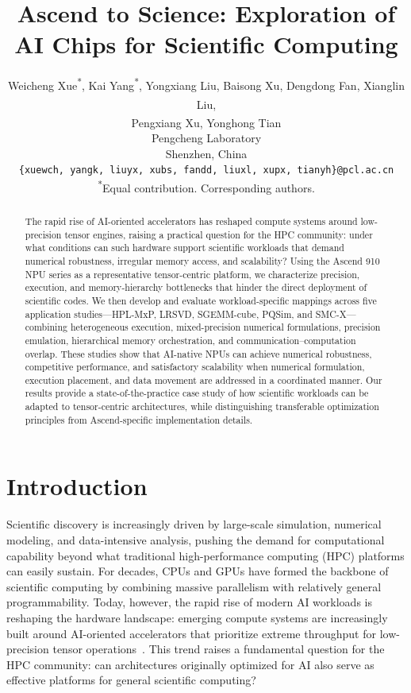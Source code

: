 \documentclass{article}
\title{Ascend to Science: Exploration of AI Chips for Scientific Computing}
\author{
  Weicheng Xue\textsuperscript{*}, Kai Yang\textsuperscript{*}, Yongxiang Liu, Baisong Xu, Dengdong Fan, Xianglin Liu\textsuperscript{\textdagger}, \\ Pengxiang Xu\textsuperscript{\textdagger}, Yonghong Tian\textsuperscript{\textdagger} \\
  Pengcheng Laboratory \\
  Shenzhen, China\\
  \texttt{\{xuewch, yangk, liuyx, xubs, fandd, liuxl, xupx, tianyh\}@pcl.ac.cn} \\
  \textsuperscript{*}Equal contribution. \textsuperscript{\textdagger}Corresponding authors. \\
}
\newcommand{\rev}[1]{#1}
\begin{document}
\maketitle


\begin{abstract}
\rev{The rapid rise of AI-oriented accelerators has reshaped compute systems around low-precision tensor engines, raising a practical question for the HPC community: under what conditions can such hardware support scientific workloads that demand numerical robustness, irregular memory access, and scalability? Using the Ascend 910 NPU series as a representative tensor-centric platform, we characterize precision, execution, and memory-hierarchy bottlenecks that hinder the direct deployment of scientific codes. We then develop and evaluate workload-specific mappings across five application studies---HPL-MxP, LRSVD, SGEMM-cube, PQSim, and SMC-X---combining heterogeneous execution, mixed-precision numerical formulations, precision emulation, hierarchical memory orchestration, and communication--computation overlap. These studies show that AI-native NPUs can achieve numerical robustness, competitive performance, and satisfactory scalability when numerical formulation, execution placement, and data movement are addressed in a coordinated manner. Our results provide a state-of-the-practice case study of how scientific workloads can be adapted to tensor-centric architectures, while distinguishing transferable optimization principles from Ascend-specific implementation details.}
\end{abstract}


\section{Introduction}
\label{sec:intro}

Scientific discovery is increasingly driven by large-scale simulation, numerical modeling, and data-intensive analysis, pushing the demand for computational capability beyond what traditional high-performance computing (HPC) platforms can easily sustain. For decades, CPUs and GPUs have formed the backbone of scientific computing by combining massive parallelism with relatively general programmability. Today, however, the rapid rise of modern AI workloads is reshaping the hardware landscape: emerging compute systems are increasingly built around AI-oriented accelerators that prioritize extreme throughput for low-precision tensor operations~\cite{doi:10.1126/science.adu0801}. This trend raises a fundamental question for the HPC community: can architectures originally optimized for AI also serve as effective platforms for general scientific computing?
\end{document}
